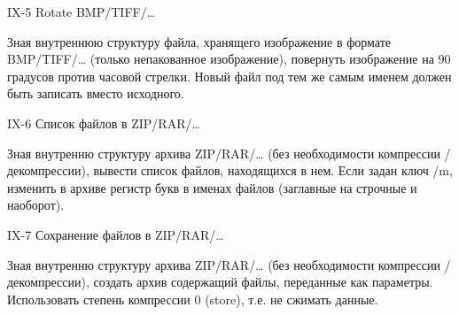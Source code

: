 
IX-5 Rotate BMP/TIFF/…

Зная внутреннюю структуру файла, хранящего изображение в формате BMP/TIFF/…
(только непакованное изображение), повернуть изображение на 90 градусов против
часовой стрелки. Новый файл под тем же самым именем должен быть записать
вместо исходного.


IX-6 Список файлов в ZIP/RAR/…

Зная внутренню структуру архива ZIP/RAR/… (без необходимости компрессии /
декомпрессии), вывести список файлов, находящихся в нем. Если задан ключ /m,
изменить в архиве регистр букв в именах файлов (заглавные на строчные и
наоборот).


IX-7 Сохранение файлов в ZIP/RAR/…

Зная внутренню структуру архива ZIP/RAR/… (без необходимости компрессии /
декомпрессии), создать архив содержащий файлы, переданные как параметры.
Использовать степень компрессии 0 (store), т.е. не сжимать данные.

